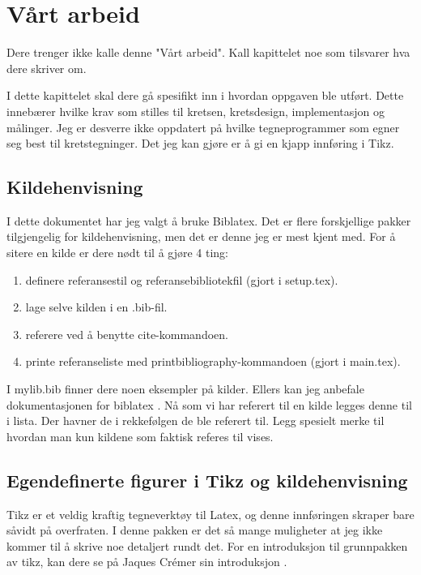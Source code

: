 \section{Vårt arbeid}

Dere trenger ikke kalle denne "Vårt arbeid". Kall kapittelet noe som tilsvarer hva dere skriver om.

I dette kapittelet skal dere gå spesifikt inn i hvordan oppgaven ble utført. 
Dette innebærer hvilke krav som stilles til kretsen, kretsdesign, implementasjon og målinger.
Jeg er desverre ikke oppdatert på hvilke tegneprogrammer som egner seg best til kretstegninger.
Det jeg kan gjøre er å gi en kjapp innføring i Tikz.

\subsection{Kildehenvisning}

I dette dokumentet har jeg valgt å bruke Biblatex. Det er flere forskjellige pakker tilgjengelig for
kildehenvisning, men det er denne jeg er mest kjent med. For å sitere en kilde er dere nødt til å gjøre 4 ting:
\begin{enumerate}
    \item definere referansestil og referansebibliotekfil (gjort i setup.tex).
    \item lage selve kilden i en .bib-fil.
    \item referere ved å benytte cite-kommandoen.
    \item printe referanseliste med printbibliography-kommandoen (gjort i main.tex).
\end{enumerate}

I mylib.bib finner dere noen eksempler på kilder. Ellers kan jeg anbefale dokumentasjonen for biblatex \cite{biblatex}.
Nå som vi har referert til en kilde legges denne til i lista. Der havner de i rekkefølgen de ble referert til.
Legg spesielt merke til hvordan man kun kildene som faktisk referes til vises. 


\newpage %
\subsection{Egendefinerte figurer i Tikz og kildehenvisning}

Tikz er et veldig kraftig tegneverktøy til Latex, og denne innføringen skraper bare såvidt på overfraten.
I denne pakken er det så mange muligheter at jeg ikke kommer til å skrive noe detaljert rundt det.
For en introduksjon til grunnpakken av tikz, kan dere se på Jaques Crémer sin introduksjon \cite{tikz_intro}.

